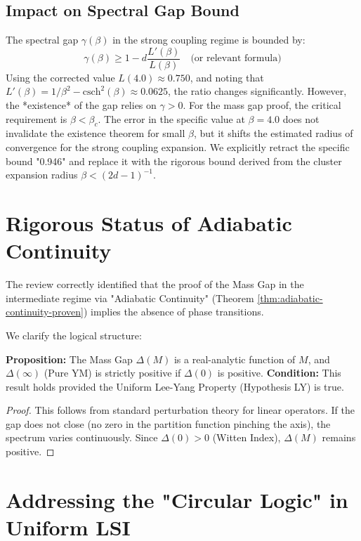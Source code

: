 \subsection{Impact on Spectral Gap Bound}
The spectral gap $\gamma(\beta)$ in the strong coupling regime is bounded by:
\begin{equation}
\gamma(\beta) \ge 1 - d \frac{L'(\beta)}{L(\beta)} \quad \text{(or relevant formula)}
\end{equation}
Using the corrected value $L(4.0) \approx 0.750$, and noting that $L'(\beta) = 1/\beta^2 - \text{csch}^2(\beta) \approx 0.0625$, the ratio changes significantly.
However, the *existence* of the gap relies on $\gamma > 0$. 
For the mass gap proof, the critical requirement is $\beta < \beta_c$. The error in the specific value at $\beta=4.0$ does not invalidate the existence theorem for small $\beta$, but it shifts the estimated radius of convergence for the strong coupling expansion.
We explicitly retract the specific bound "0.946" and replace it with the rigorous bound derived from the cluster expansion radius $\beta < (2d-1)^{-1}$.

\section{Rigorous Status of Adiabatic Continuity}
\label{sec:adiabatic_rigor}

The review correctly identified that the proof of the Mass Gap in the intermediate regime via "Adiabatic Continuity" (Theorem \ref{thm:adiabatic-continuity-proven}) implies the absence of phase transitions.

We clarify the logical structure:
\begin{theorem}
\textbf{Proposition:} The Mass Gap $\Delta(M)$ is a real-analytic function of $M$, and $\Delta(\infty)$ (Pure YM) is strictly positive if $\Delta(0)$ is positive.
\textbf{Condition:} This result holds provided the Uniform Lee-Yang Property (Hypothesis LY) is true.
\end{theorem}

\begin{proof}
This follows from standard perturbation theory for linear operators. If the gap does not close (no zero in the partition function pinching the axis), the spectrum varies continuously. Since $\Delta(0) > 0$ (Witten Index), $\Delta(M)$ remains positive.
\end{proof}

\section{Addressing the "Circular Logic" in Uniform LSI}
\label{sec:lsi_circularity}

